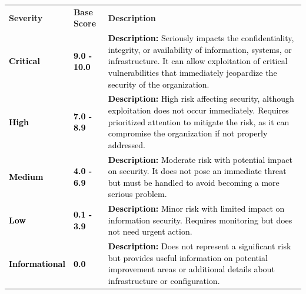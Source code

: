 \begin{center}
\begin{table}[h!]
    \centering
    \begin{tabularx}{\textwidth}{|>{\centering\arraybackslash}m{3cm}|>{\centering\arraybackslash}m{3cm}|m{11cm}|}
        \hline
        \rowcolor{TableHeaderBgRowColor} 
        \multicolumn{3}{|c|}{\textbf{Information Security Risk Rating Scale}} \\
        \hline
        \rowcolor{TableHeaderBgRowColor}
        \textbf{Severity} & \textbf{Base Score} & \textbf{Description} \\
        \hline
        \cellcolor{CriticalVulnColor}\textcolor{black}{\textbf{Critical}} &
        \cellcolor{gray!40} \textcolor{black}{\textbf{9.0 - 10.0}} &
        \cellcolor{gray!40} \textcolor{black}{\textbf{Description:} Seriously impacts the confidentiality, integrity, or availability of information, systems, or infrastructure. It can allow exploitation of critical vulnerabilities that immediately jeopardize the security of the organization.} \\
        \hline
        \cellcolor{HighVulnColor}\textcolor{black}{\textbf{High}} &
        \cellcolor{gray!40} \textcolor{black}{\textbf{7.0 - 8.9}} &
        \cellcolor{gray!40} \textcolor{black}{\textbf{Description:} High risk affecting security, although exploitation does not occur immediately. Requires prioritized attention to mitigate the risk, as it can compromise the organization if not properly addressed.} \\
        \hline
        \cellcolor{MediumVulnColor}\textcolor{black}{\textbf{Medium}} &
        \cellcolor{gray!40} \textcolor{black}{\textbf{4.0 - 6.9}} &
        \cellcolor{gray!40} \textcolor{black}{\textbf{Description:} Moderate risk with potential impact on security. It does not pose an immediate threat but must be handled to avoid becoming a more serious problem.} \\
        \hline
        \cellcolor{LowVulnColor}\textcolor{black}{\textbf{Low}} &
        \cellcolor{gray!40} \textcolor{black}{\textbf{0.1 - 3.9}} &
        \cellcolor{gray!40} \textcolor{black}{\textbf{Description:} Minor risk with limited impact on information security. Requires monitoring but does not need urgent action.} \\
        \hline
        \cellcolor{InfoVulnColor}\textcolor{black}{\textbf{Informational}} &
        \cellcolor{gray!40} \textcolor{black}{\textbf{0.0}} &
        \cellcolor{gray!40} \textcolor{black}{\textbf{Description:} Does not represent a significant risk but provides useful information on potential improvement areas or additional details about infrastructure or configuration.} \\
        \hline
    \end{tabularx}
    \label{table:information-security-risk-rating-scale}
\end{table}
\end{center}
